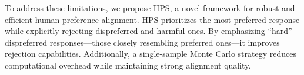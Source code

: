 
To address these limitations, we propose HPS, a novel framework for robust and efficient human preference alignment. HPS prioritizes the most preferred response while explicitly rejecting dispreferred and harmful ones. By emphasizing ``hard” dispreferred responses—those closely resembling preferred ones—it improves rejection capabilities. Additionally, a single-sample Monte Carlo strategy reduces computational overhead while maintaining strong alignment quality.  

